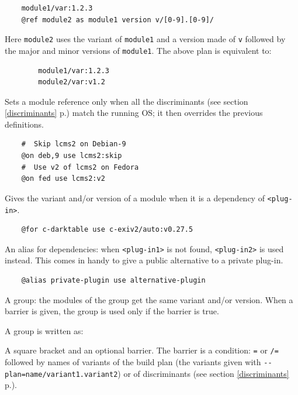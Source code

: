 \documentclass[a4paper,12pt,twoside]{article}
\newcommand{\code}[1]{\texttt{#1}}
\newcommand{\seeref}[1]{see section \ref{#1} p.\pageref{#1}}
\newcommand{\ddash}{-{}-}
\begin{document}
\begin{description}
	\begin{lstlisting}
	module1/var:1.2.3
	@ref module2 as module1 version v/[0-9].[0-9]/
	\end{lstlisting}

	Here \code{module2} uses the variant of \code{module1} and a version made of \code{v} followed by the major and minor versions of \code{module1}. The above plan is equivalent to:

	\begin{lstlisting}
		module1/var:1.2.3
		module2/var:v1.2
	\end{lstlisting}

	\item[\code{@on <discriminants> use <module-reference>}] Sets a module reference only when all the discriminants (\seeref{discriminants}) match the running OS; it then overrides the previous definitions.

	\begin{lstlisting}
	#  Skip lcms2 on Debian-9
	@on deb,9 use lcms2:skip
	#  Use v2 of lcms2 on Fedora
	@on fed use lcms2:v2
	\end{lstlisting}

	\item[\code{@for <plug-in> use <modref>}] Gives the variant and/or version of a module when it is a dependency of \code{<plug-in>}.
	\label{formodule}

    \begin{lstlisting}
	@for c-darktable use c-exiv2/auto:v0.27.5
    \end{lstlisting}

	\item[\code{@alias <plug-in1> use <plug-in2>}] An alias for dependencies: when \code{<plug-in1>} is not found, \code{<plug-in2>} is used instead. This comes in handy to give a public alternative to a private plug-in.

	\begin{lstlisting}
	@alias private-plugin use alternative-plugin
	\end{lstlisting}

	\item[\code{[ <barrier> ... ] /variant:version}] A group: the modules of the group get the same variant and/or version. When a barrier is given, the group is used only if the barrier is true.

	A group is written as:

	\begin{description}
		\label{plan-barrier}
		\item[ {[} <barrier>] A square bracket and an optional barrier. The barrier is a condition: \code{=} or \code{/=} followed by names of variants of the build plan (the variants given with \code{\ddash{}plan=name/variant1.variant2}) or of discriminants (\seeref{discriminants}).


\end{description}
\end{description}
\end{document}
